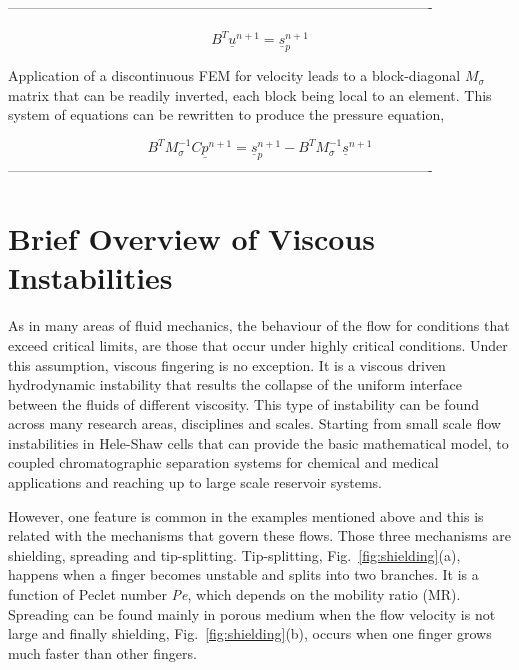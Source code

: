 \documentclass[preprint,authoryear,12pt]{elsarticle}
\begin{document}
-------------------------------------------------------------------------------------------

\begin{equation}
B^T {{\underline{u}}^{n+1}} = {\underline{s}_p ^{n+1}}
\label{force balance eq}
\end{equation}

\noindent Application of a discontinuous FEM for velocity leads to a block-diagonal $M_{\sigma}$ matrix that can be readily inverted, each block being local to an element. This system of equations can be rewritten to produce the pressure equation, 

\begin{equation}
B^T M_{\sigma} ^{-1} C{{\underline{p}}^{n+1}} = {\underline{s}_p ^{n+1}} - B^T M_{\sigma} ^{-1} {{\underline{s}}^{n+1}} 
\label{pressure eq}
\end{equation}
-------------------------------------------------------------------------------------------
   

\section{Brief Overview of Viscous Instabilities}\label{section:ViscousInstabilities}
As in many areas of fluid mechanics, the behaviour of the flow for conditions that exceed critical limits, are those that occur under highly critical conditions. Under this assumption, viscous fingering is no exception. It is a viscous driven hydrodynamic instability that results the collapse of the uniform interface between the fluids of different viscosity. This type of instability can be found across many research areas, disciplines and scales. Starting from small scale flow instabilities in Hele-Shaw cells that can provide the basic mathematical model, to coupled chromatographic separation systems for chemical and medical applications and reaching up to large scale reservoir systems.

However, one feature is common in the examples mentioned above and this is related with the mechanisms that govern these flows. Those three mechanisms are shielding, spreading and tip-splitting. Tip-splitting, Fig.~\ref{fig:shielding}(a), happens when a finger becomes unstable and splits into two branches. It is a function of Peclet number \textit{Pe}, which depends on the mobility ratio (MR). Spreading can be found mainly in porous medium when the flow velocity is not large and finally shielding, Fig.~\ref{fig:shielding}(b), occurs when one finger grows much faster than other fingers.
\end{document}
